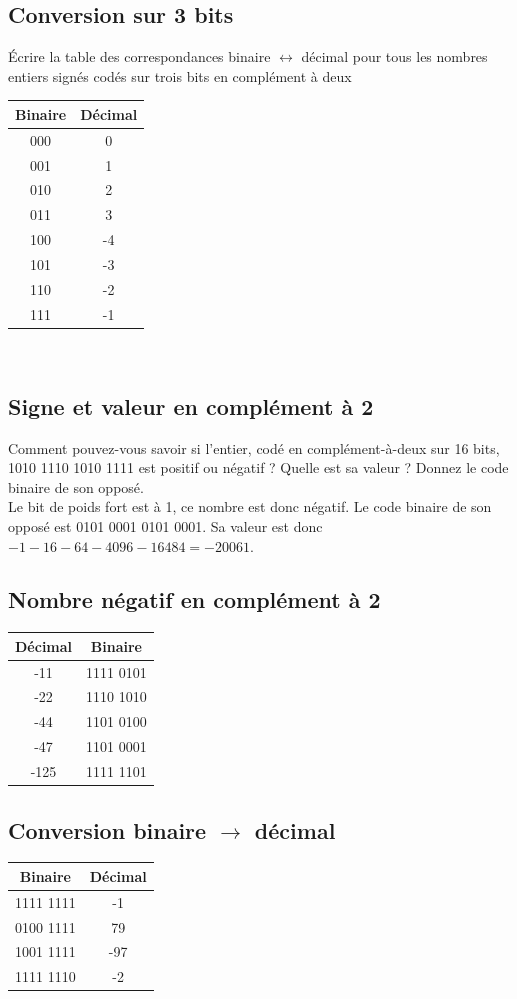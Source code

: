 \documentclass[10pt,a4paper]{article}
\begin{document}
\subsection{Conversion sur 3 bits}
Écrire la table des correspondances binaire $\leftrightarrow$ décimal pour tous les nombres entiers signés codés sur trois bits en complément à deux\\

\begin{tabular}{c|c}
Binaire & Décimal \\ 
\hline 
000 & 0 \\ 
001 & 1 \\ 
010 & 2 \\ 
011 & 3 \\ 
100 & -4 \\ 
101 & -3 \\ 
110 & -2 \\ 
111 & -1 \\ 
\end{tabular} \\

\subsection{Signe et valeur en complément à 2}
Comment pouvez-vous savoir si l’entier, codé en complément-à-deux sur 16 bits, 1010 1110 1010 1111 est positif ou négatif ? Quelle est sa valeur ? Donnez le code binaire de son opposé.\\
Le bit de poids fort est à 1, ce nombre est donc négatif. Le code binaire de son opposé est 0101 0001 0101 0001. Sa valeur est donc $-1-16-64-4096-16484 = -20061$.

\subsection{Nombre négatif en complément à 2}
\begin{tabular}{c|c}
Décimal & Binaire \\ 
\hline 
-11 &  1111 0101 \\ 
-22 &  1110 1010 \\ 
-44 &  1101 0100 \\ 
-47 &  1101 0001 \\ 
-125 & 1111 1101
\end{tabular} 

\subsection{Conversion binaire $\rightarrow$ décimal}
\begin{tabular}{c|c}
Binaire & Décimal \\ 
\hline 
1111 1111 & -1\\ 
0100 1111 & 79\\ 
1001 1111 & -97\\ 
1111 1110 & -2
\end{tabular}
\end{document}
